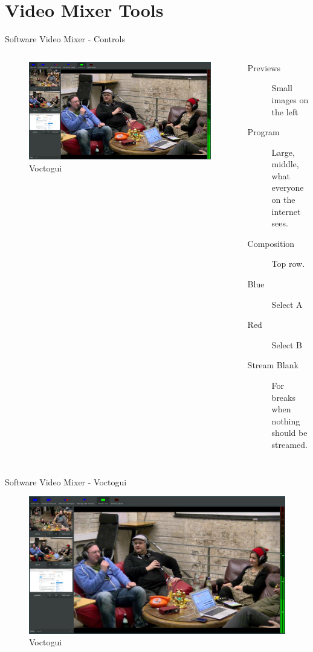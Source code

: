 \documentclass[aspectratio=169]{beamer}
\begin{document}
\section{Video Mixer Tools}
\begin{frame}{Software Video Mixer - Controls}
	\begin{columns}[T,onlytextwidth]
	\begin{figure} 
		\centering
		\includegraphics[width=1\textwidth]{images/voctomix.png}
		\caption{Voctogui}
		\label{fig:voctogui1}
	\end{figure}

	\begin{description}
		\item[Previews] Small images on the left 
		\item[Program] Large, middle, what everyone on the internet sees.
		\item[Composition] Top row.
		\item[Blue] Select A
		\item[Red] Select B
		\item[Stream Blank] For breaks when nothing should be streamed.
     \end{description}
	\end{columns}
\end{frame}

\begin{frame}{Software Video Mixer - Voctogui}
	\begin{figure} 
		\centering
		\includegraphics[width=.9\textwidth]{images/voctomix.png}
		\caption{Voctogui}
	\end{figure}
\end{frame}
\end{document}

